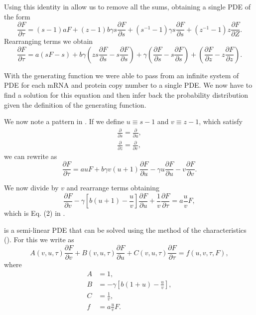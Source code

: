 Using this identity in  allow us to remove all the
sums, obtaining a single PDE of the form
\begin{equation}
\frac{\partial F}{\partial \tau} =
(s - 1) a F + (z - 1) b \gamma s \frac{\partial F}{\partial s}
+ \left( s^{-1} - 1 \right) \gamma s \frac{\partial F}{\partial s}
+ \left( z^{-1} - 1 \right) z \frac{\partial F}{\partial Z}.
\end{equation}
Rearranging terms we obtain
\begin{equation}
\frac{\partial F}{\partial \tau} =
a (sF - s)
+ b \gamma \left( z s \frac{\partial F}{\partial s} - s \frac{\partial
F}{\partial s} \right)
+ \gamma \left( \frac{\partial F}{\partial s} - s \frac{\partial F}{\partial s}
\right)
+ \left( \frac{\partial F}{\partial z} - z \frac{\partial F}{\partial z}
\right).
\label{eq_df_dtau_PDE}
\end{equation}

With the generating function we were able to pass from an infinite system of PDE
for each mRNA and protein copy number to a single PDE. We now have to find a
solution for this equation and then infer back the probability distribution
given the definition of the generating function.

We now note a pattern in . If we define $u \equiv s - 1$ and $v \equiv z - 1$, which satisfy
\begin{align}
  \frac{\partial}{\partial s} = \frac{\partial}{\partial u},\\
  \frac{\partial}{\partial z} = \frac{\partial}{\partial v},
\end{align}
we can rewrite  as
\begin{equation}
  \frac{\partial F}{\partial \tau} =
  a u F
  + b \gamma v \left( u + 1  \right) \frac{\partial F}{\partial u}
  - \gamma u \frac{\partial F}{\partial u}
  - v \frac{\partial F}{\partial v}.
\end{equation}

We now divide by $v$ and rearrange terms obtaining
\begin{equation}
  \frac{\partial F}{\partial v}
  - \gamma \left[ b (u + 1) - \frac{u}{v} \right] \frac{\partial F}{\partial u}
  + \frac{1}{v} \frac{\partial F}{\partial \tau}
  = a \frac{u}{v} F,
  \label{eq_swain_2}
\end{equation}
which is Eq. (2) in \cite{Shahrezaei2008}.

\eref[eq_swain_2] is a semi-linear PDE that can be solved using the method of
the characteristics (). For this we
write \eref[eq_swain_2] as
\begin{equation}
  A(v, u, \tau) \frac{\partial F}{\partial v}
  + B(v, u, \tau) \frac{\partial F}{\partial u}
  + C(v, u, \tau) \frac{\partial F}{\partial \tau}
  = f(u, v, \tau, F),
\end{equation}
where
\begin{align}
  A &= 1,\\
  B &= - \gamma \left[ b (1 + u) - \frac{u}{v} \right],\\
  C &= \frac{1}{v},\\
  f &= a \frac{u}{v} F.
\end{align}


